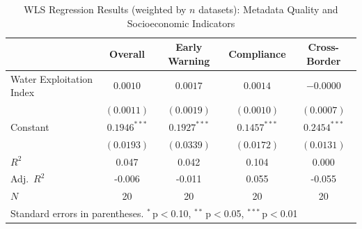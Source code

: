 \begin{table}[htbp]
\centering
\caption{WLS Regression Results (weighted by $n$ datasets): Metadata Quality and Socioeconomic Indicators}
\label{tab:regression_wls}
\begin{tabular}{lcccc}
\toprule
& \textbf{Overall} & \textbf{Early Warning} & \textbf{Compliance} & \textbf{Cross-Border} \\
\midrule
Water Exploitation Index & $0.0010$ & $0.0017$ & $0.0014$ & $-0.0000$ \\
 & $(0.0011)$ & $(0.0019)$ & $(0.0010)$ & $(0.0007)$ \\
Constant & $0.1946^{***}$ & $0.1927^{***}$ & $0.1457^{***}$ & $0.2454^{***}$ \\
 & $(0.0193)$ & $(0.0339)$ & $(0.0172)$ & $(0.0131)$ \\
\midrule
$R^2$ & 0.047 & 0.042 & 0.104 & 0.000 \\
Adj.\ $R^2$ & -0.006 & -0.011 & 0.055 & -0.055 \\
$N$ & 20 & 20 & 20 & 20 \\
\bottomrule
\multicolumn{5}{l}{\footnotesize Standard errors in parentheses. $^{*}$\,p$<$0.10, $^{**}$\,p$<$0.05, $^{***}$\,p$<$0.01}} \\
\end{tabular}
\end{table}